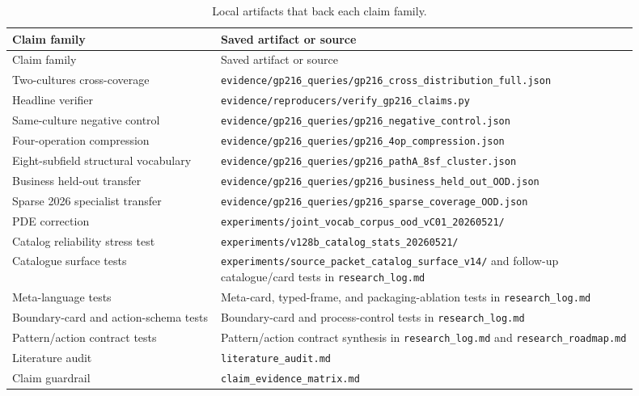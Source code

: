 \documentclass[11pt]{article}
\begin{document}
\begingroup
\scriptsize
\begin{longtable}{p{0.30\linewidth}p{0.60\linewidth}}
\caption{Local artifacts that back each claim family.}
\label{tab:evidence-map}\\
\toprule
Claim family & Saved artifact or source \\
\midrule
\endfirsthead
\toprule
Claim family & Saved artifact or source \\
\midrule
\endhead
Two-cultures cross-coverage & \texttt{evidence/gp216\_queries/gp216\_cross\_distribution\_full.json} \\
Headline verifier & \texttt{evidence/reproducers/verify\_gp216\_claims.py} \\
Same-culture negative control & \texttt{evidence/gp216\_queries/gp216\_negative\_control.json} \\
Four-operation compression & \texttt{evidence/gp216\_queries/gp216\_4op\_compression.json} \\
Eight-subfield structural vocabulary & \texttt{evidence/gp216\_queries/gp216\_pathA\_8sf\_cluster.json} \\
Business held-out transfer & \texttt{evidence/gp216\_queries/gp216\_business\_held\_out\_OOD.json} \\
Sparse 2026 specialist transfer & \texttt{evidence/gp216\_queries/gp216\_sparse\_coverage\_OOD.json} \\
PDE correction & \texttt{experiments/joint\_vocab\_corpus\_ood\_vC01\_20260521/} \\
Catalog reliability stress test & \texttt{experiments/v128b\_catalog\_stats\_20260521/} \\
Catalogue surface tests & \texttt{experiments/source\_packet\_catalog\_surface\_v14/} and follow-up catalogue/card tests in \texttt{research\_log.md} \\
Meta-language tests & Meta-card, typed-frame, and packaging-ablation tests in \texttt{research\_log.md} \\
Boundary-card and action-schema tests & Boundary-card and process-control tests in \texttt{research\_log.md} \\
Pattern/action contract tests & Pattern/action contract synthesis in \texttt{research\_log.md} and \texttt{research\_roadmap.md} \\
Literature audit & \texttt{literature\_audit.md} \\
Claim guardrail & \texttt{claim\_evidence\_matrix.md} \\
\bottomrule
\end{longtable}
\endgroup



\end{document}
